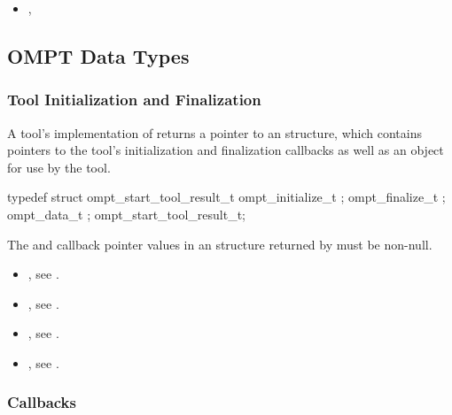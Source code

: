 \crossreferences
\begin{itemize}
\item {}, 
\end{itemize}

\subsection{OMPT Data Types}
\label{sec:ompt-data-types}

\subsubsection{Tool Initialization and Finalization}
\label{sec:ompt_start_tool_result_t}

\summary
A tool's implementation of  returns a pointer to an
 structure, which
contains pointers to the tool's
initialization and finalization callbacks as well as an
 object for use by the tool.


\begin{ccppspecific}
\begin{omptOther}
typedef struct ompt_start_tool_result_t {
  ompt_initialize_t ;
  ompt_finalize_t ;
  ompt_data_t ;
} ompt_start_tool_result_t;
\end{omptOther}
\end{ccppspecific}


\restrictions

The  and  callback pointer values in an
 structure returned by  must be
non-null.

\crossreferences
\begin{itemize}
\item {}, see .
\item {}, see .
\item {}, see .
\item {}, see .
\end{itemize}

\subsubsection{Callbacks}
\label{sec:ompt_callbacks_t}

